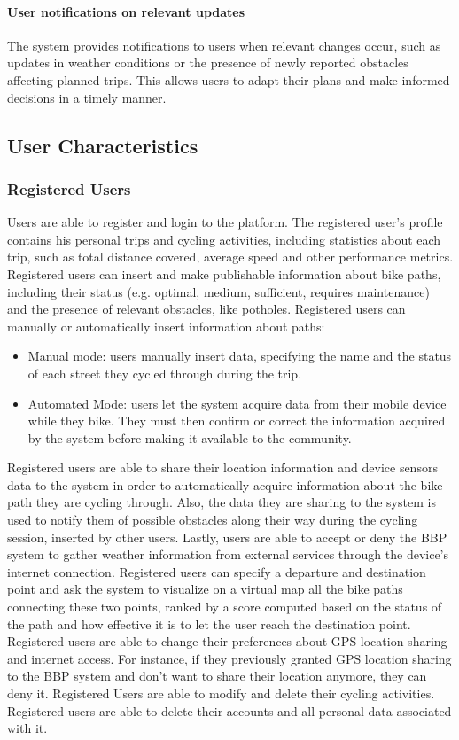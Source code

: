 \paragraph{User notifications on relevant updates}
The system provides notifications to users when relevant changes occur, such as updates in weather conditions or the presence of newly reported obstacles affecting planned trips. This allows users to adapt their plans and make informed decisions in a timely manner.

\subsection{User Characteristics}

\subsubsection{Registered Users}
Users are able to register and login to the platform. The registered user’s profile contains his personal trips and cycling activities, including statistics about each trip, such as total distance covered, average speed and other performance metrics. Registered users can insert and make publishable information about bike paths, including their status (e.g. optimal, medium, sufficient, requires maintenance) and the presence of relevant obstacles, like potholes. Registered users can manually or automatically insert information about paths:
\begin{itemize}
    \item Manual mode: users manually insert data, specifying the name and the status of each street they cycled through during the trip.
    \item Automated Mode: users let the system acquire data from their mobile device while they bike. They must then confirm or correct the information acquired by the system before making it available to the community.
\end{itemize}
Registered users are able to share their location information and device sensors data to the system in order to automatically acquire information about the bike path they are cycling through. Also, the data they are sharing to the system is used to notify them of possible obstacles along their way during the cycling session, inserted by other users. Lastly, users are able to accept or deny the BBP system to gather weather information from external services through the device’s internet connection.
Registered users can specify a departure and destination point and ask the system to visualize on a virtual map all the bike paths connecting these two points, ranked by a score computed based on the status of the path and how effective it is to let the user reach the destination point. 
Registered users are able to change their preferences about GPS location sharing and internet access. For instance, if they previously granted GPS location sharing to the BBP system and don’t want to share their location anymore, they can deny it.
Registered Users are able to modify and delete their cycling activities.
Registered users are able to delete their accounts and all personal data associated with it. 

